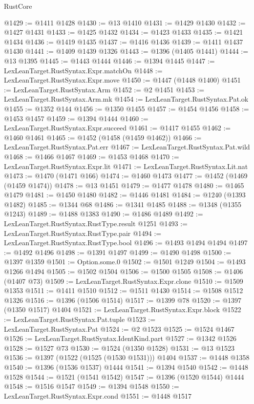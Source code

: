 \begin{lexlean}{RustCore}
\begin{coremodule}
@1429 := @1411 @1428
@1430 := @13 @1410
@1431 := @1429 @1430
@1432 := @1427 @1431
@1433 := @1425 @1432
@1434 := @1423 @1433
@1435 := @1421 @1434
@1436 := @1419 @1435
@1437 := @1416 @1436
@1439 := @1411 @1437 @1430
@1441 := @1409 @1439 @1326
@1443 := @1396 (@1405 @1441)
@1444 := @13 @1395
@1445 := @1443 @1444
@1446 := @1394 @1445
@1447 := LexLeanTarget.RustSyntax.Expr.matchOn
@1448 := LexLeanTarget.RustSyntax.Expr.move
@1450 := @1447 (@1448 @1400)
@1451 := LexLeanTarget.RustSyntax.Arm
@1452 := @2 @1451
@1453 := LexLeanTarget.RustSyntax.Arm.mk
@1454 := LexLeanTarget.RustSyntax.Pat.ok
@1455 := @1352 @144
@1456 := @1350 @1455
@1457 := @1454 @1456
@1458 := @1453 @1457
@1459 := @1394 @1444
@1460 := LexLeanTarget.RustSyntax.Expr.succeed
@1461 := @1417 @1455
@1462 := @1460 @1461
@1465 := @1452 (@1458 (@1459 @1462))
@1466 := LexLeanTarget.RustSyntax.Pat.err
@1467 := LexLeanTarget.RustSyntax.Pat.wild
@1468 := @1466 @1467
@1469 := @1453 @1468
@1470 := LexLeanTarget.RustSyntax.Expr.lit
@1471 := LexLeanTarget.RustSyntax.Lit.nat
@1473 := @1470 (@1471 @166)
@1474 := @1460 @1473
@1477 := @1452 (@1469 (@1459 @1474))
@1478 := @13 @1451
@1479 := @1477 @1478
@1480 := @1465 @1479
@1481 := @1450 @1480
@1482 := @1446 @1481
@1484 := @1240 (@1393 @1482)
@1485 := @1344 @68
@1486 := @1341 @1485
@1488 := @1348 (@1355 @1243)
@1489 := @1488 @1383
@1490 := @1486 @1489
@1492 := LexLeanTarget.RustSyntax.RustType.result @1251
@1493 := LexLeanTarget.RustSyntax.RustType.pair
@1494 := LexLeanTarget.RustSyntax.RustType.bool
@1496 := @1493 @1494 @1494
@1497 := @1492 @1496
@1498 := @1391 @1497
@1499 := @1490 @1498
@1500 := @1397 @1359
@1501 := Option.some.{0}
@1502 := @1501 @1249
@1504 := @1493 @1266 @1494
@1505 := @1502 @1504
@1506 := @1500 @1505
@1508 := @1406 (@1407 @73)
@1509 := LexLeanTarget.RustSyntax.Expr.clone
@1510 := @1509 @1353
@1511 := @1411 @1510
@1512 := @1511 @1430
@1514 := @1508 @1512 @1326
@1516 := @1396 (@1506 @1514)
@1517 := @1399 @78
@1520 := @1397 (@1350 @1517) @1404
@1521 := LexLeanTarget.RustSyntax.Expr.block
@1522 := LexLeanTarget.RustSyntax.Pat.tuple
@1523 := LexLeanTarget.RustSyntax.Pat
@1524 := @2 @1523
@1525 := @1524 @1467
@1526 := LexLeanTarget.RustSyntax.IdentKind.part
@1527 := @1342 @1526
@1528 := @1527 @73
@1530 := @1524 (@1350 @1528)
@1531 := @13 @1523
@1536 := @1397 (@1522 (@1525 (@1530 @1531))) @1404
@1537 := @1448 @1358
@1540 := @1396 (@1536 @1537) @1444
@1541 := @1394 @1540
@1542 := @1448 @1528
@1544 := @1521 (@1541 @1542)
@1547 := @1396 (@1520 @1544) @1444
@1548 := @1516 @1547
@1549 := @1394 @1548
@1550 := LexLeanTarget.RustSyntax.Expr.cond
@1551 := @1448 @1517

\end{coremodule}
\end{lexlean}
